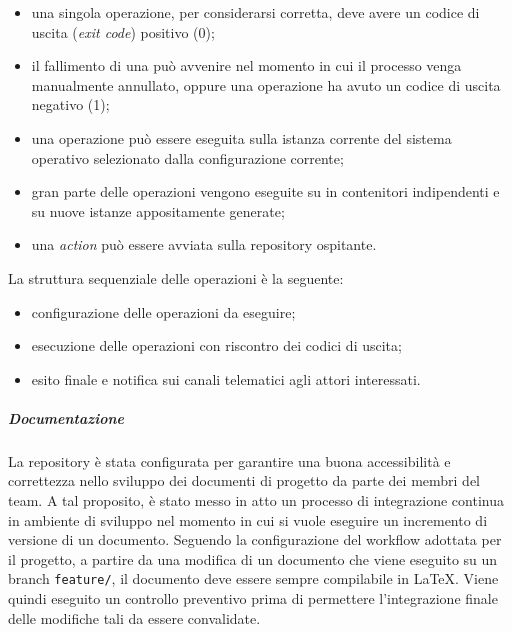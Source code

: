		\begin{itemize}
			\item una singola operazione, per considerarsi corretta, deve avere un codice di uscita (\textit{exit code}) positivo (0);
			\item il fallimento di una  può avvenire nel momento in cui il processo venga manualmente annullato, oppure una operazione ha avuto un codice di uscita negativo (1);
			\item una operazione può essere eseguita sulla istanza corrente del sistema operativo selezionato dalla configurazione corrente;
			\item gran parte delle operazioni vengono eseguite su  in contenitori indipendenti e su nuove istanze appositamente generate;
			\item una \textit{action} può essere avviata sulla repository ospitante.
		\end{itemize}

		La struttura sequenziale delle operazioni è la seguente:

		\begin{itemize}
			\item configurazione delle operazioni da eseguire;
			\item esecuzione delle operazioni con riscontro dei codici di uscita;
			\item esito finale e notifica sui canali telematici agli attori interessati.
		\end{itemize}

		\subparagraph{Documentazione}

		La repository è stata configurata per garantire una buona accessibilità e correttezza nello sviluppo dei documenti di progetto da parte dei membri del team. A tal proposito, è stato messo in atto un processo di integrazione continua in ambiente di sviluppo nel momento in cui si vuole eseguire un incremento di versione di un documento. 
		Seguendo la configurazione del workflow adottata per il progetto, a partire da una modifica di un documento che viene eseguito su un branch \verb!feature/!, il documento deve essere sempre compilabile in \LaTeX{}. 
		Viene quindi eseguito un controllo preventivo prima di permettere l'integrazione finale delle modifiche tali da essere convalidate.

